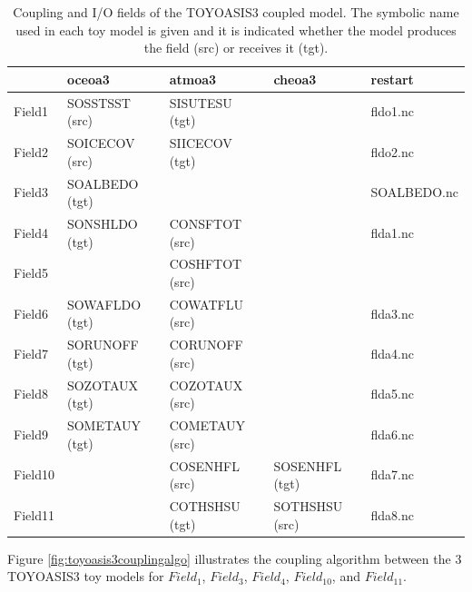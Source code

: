 \vspace*{1ex}
\begin{table}[ht]
	\begin{tabularx}{16cm}[t]{|l|l|l|l|X|}
	\hline
	  & 
	 oceoa3 & 
	 atmoa3 & 
	 cheoa3 &
	 restart \\
	\hline\hline
	 Field1 & 
	 SOSSTSST (src) & 
	 SISUTESU (tgt) &
	 & 
	 fldo1.nc \\
	\hline
	 Field2 & 
	 SOICECOV (src) & 
	 SIICECOV (tgt) &
	 & 
	 fldo2.nc \\
	\hline
	 Field3 & 
	 SOALBEDO (tgt) & 
	 & 
	 &
	 SOALBEDO.nc \\
	\hline
         Field4 & 
	 SONSHLDO (tgt) &
	 CONSFTOT (src) &
	 &
	 flda1.nc \\
	\hline
         Field5  &    
         &
	 COSHFTOT (src)&
	 &
	 \\
	\hline
         Field6 &    
         SOWAFLDO (tgt) &
         COWATFLU (src) &
         &
         flda3.nc \\
	\hline    
         Field7 & 
         SORUNOFF (tgt) &
         CORUNOFF (src) &
         &
         flda4.nc \\
	\hline    
         Field8 &
         SOZOTAUX (tgt)&
         COZOTAUX (src)&
         &
         flda5.nc \\
	\hline    
         Field9 &
         SOMETAUY (tgt)&
         COMETAUY (src)&
         &
         flda6.nc \\
	\hline
	 Field10 &
         &
         COSENHFL (src) &
         SOSENHFL (tgt) &
         flda7.nc \\
	 \hline
	 Field11 &
         &
         COTHSHSU (tgt)&
         SOTHSHSU (src) &
         flda8.nc \\
	 \hline	         
	\end{tabularx}
\caption[Coupling and I/O fields of the TOYOASIS3 coupled model]
	{Coupling and I/O fields of the TOYOASIS3 coupled model. The
	symbolic name used in each toy model is given and it is
	indicated whether the model produces the field (src) or
	receives it (tgt). }
\label{tab:couplingIOfields}
\end{table}
\vspace*{1ex}

Figure \ref{fig:toyoasis3couplingalgo} illustrates the coupling
algorithm between the 3 TOYOASIS3 toy models for $Field_1$, $Field_3$,
$Field_4$, $Field_{10}$, and $Field_{11}$.

